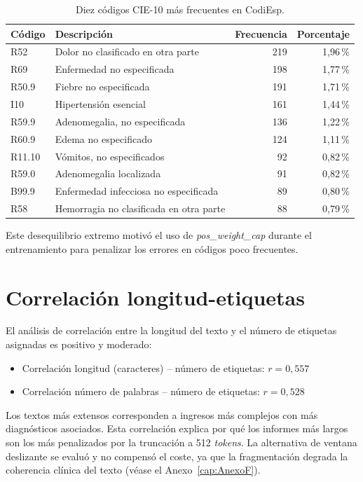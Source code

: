 \begin{table}[h]
\centering
\caption{Diez códigos CIE-10 más frecuentes en CodiEsp.}
\label{tab:top-codes}
\begin{tabular}{llrr}
\hline
\textbf{Código} & \textbf{Descripción} & \textbf{Frecuencia} & \textbf{Porcentaje} \\
\hline
R52 & Dolor no clasificado en otra parte & 219 & 1{,}96\,\% \\
R69 & Enfermedad no especificada & 198 & 1{,}77\,\% \\
R50.9 & Fiebre no especificada & 191 & 1{,}71\,\% \\
I10 & Hipertensión esencial & 161 & 1{,}44\,\% \\
R59.9 & Adenomegalia, no especificada & 136 & 1{,}22\,\% \\
R60.9 & Edema no especificado & 124 & 1{,}11\,\% \\
R11.10 & Vómitos, no especificados & 92 & 0{,}82\,\% \\
R59.0 & Adenomegalia localizada & 91 & 0{,}82\,\% \\
B99.9 & Enfermedad infecciosa no especificada & 89 & 0{,}80\,\% \\
R58 & Hemorragia no clasificada en otra parte & 88 & 0{,}79\,\% \\
\hline
\end{tabular}
\end{table}

Este desequilibrio extremo motivó el uso de \emph{pos\_weight\_cap} durante el entrenamiento para penalizar los errores en códigos poco frecuentes.

\section{Correlación longitud-etiquetas}

El análisis de correlación entre la longitud del texto y el número de etiquetas asignadas es positivo y moderado:

\begin{itemize}
 \item Correlación longitud (caracteres) -- número de etiquetas: $r = 0{,}557$
 \item Correlación número de palabras -- número de etiquetas: $r = 0{,}528$
\end{itemize}

Los textos más extensos corresponden a ingresos más complejos con más diagnósticos asociados. Esta correlación explica por qué los informes más largos son los más penalizados por la truncación a 512 \emph{tokens}. La alternativa de ventana deslizante se evaluó y no compensó el coste, ya que la fragmentación degrada la coherencia clínica del texto (véase el Anexo~\ref{cap:AnexoF}).

